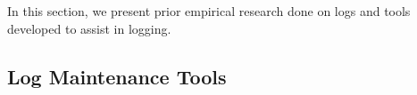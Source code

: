 

In this section, we present prior empirical research done on logs and tools developed to assist in logging.


\subsection{Log Maintenance Tools}


%
%




